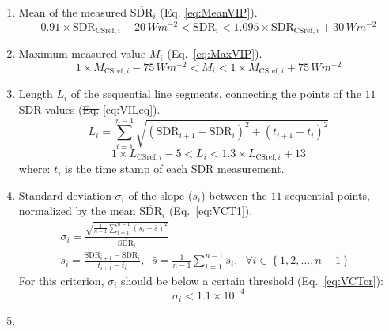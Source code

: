 \documentclass[applsci,article,submit,moreauthors,pdftex]{Definitions/mdpi}
\providecommand{\tightlist}{%
  \setlength{\itemsep}{0pt}\setlength{\parskip}{0pt}}
\providecommand{\DIFadd}[1]{{\protect\color{blue}\uwave{#1}}} %
\providecommand{\DIFdel}[1]{{\protect\color{red}\sout{#1}}}                      %
\providecommand{\DIFaddbegin}{} %
\providecommand{\DIFaddend}{} %
\providecommand{\DIFdelbegin}{} %
\providecommand{\DIFdelend}{} %
\begin{document}
\begin{enumerate}
\def\labelenumi{\alph{enumi})}
\tightlist
\item
  Mean of the measured \(\overline{\text{SDR}}_i\) (Eq.
  \ref{eq:MeanVIP}). \begin{equation}
  0.91 \times \overline{\text{SDR}}_{\text{CSref},i} - 20\,Wm^{-2}
  < \overline{\text{SDR}}_i <
  1.095 \times \overline{\text{SDR}}_{\text{CSref},i} + 30\,Wm^{-2}
  \label{eq:MeanVIP}
  \end{equation}
\item
  Maximum measured value \(M_{i}\) (Eq.~\ref{eq:MaxVIP}).
  \begin{equation}
  1 \times M_{\text{CSref},i} - 75\,Wm^{-2}
  < M_{i} <
  1 \times M_{\text{CSref},i} + 75\,Wm^{-2}
  \label{eq:MaxVIP}
  \end{equation}
\item
  Length \(L_i\) of the sequential line segments, connecting the points
  of the \(11\) SDR values (\DIFdelbegin \DIFdel{Eq. }\DIFdelend \DIFaddbegin \DIFadd{Equation }\DIFaddend \ref{eq:VILeq}). \begin{equation}
  L_i = \sum_{i=1}^{n-1}\sqrt{\left ( \text{SDR}_{i+1} - \text{SDR}_{i}\right )^2 + \left ( t_{i+1} - t_i \right )^2}
  \label{eq:VILeq}
  \end{equation} \begin{equation}
  1 \times L_{\text{CSref},i} - 5 < L_i < 1.3 \times L_{\text{CSref},i} + 13
  \label{eq:VILcr}
  \end{equation} where: \(t_i\) is the time stamp of each SDR
  measurement.
\item
  Standard deviation \(\sigma_i\) of the slope (\(s_i\)) between the
  \(11\) sequential points, normalized by the mean
  \(\overline{\text{SDR}}_i\) (Eq.~\ref{eq:VCT1}). \begin{gather}
    \sigma_i = \frac{\sqrt{\frac{1}{n-1} \sum_{i=1}^{n-1} \left( s_i - \bar{s} \right)^2}}{\overline{\text{SDR}}_i} \label{eq:VCT1} \\
    s_i = \frac{\text{SDR}_{i+1} - \text{SDR}_{i}}{t_{i+1} - t_i},\;\;   \bar{s} = \frac{1}{n-1} \sum_{i=1}^{n-1} s_i,\;\;\forall i \in \left \{ 1, 2, \ldots, n-1 \right \}\;\;
  \end{gather} For this criterion, \(\sigma_i\) should be below a
  certain threshold (Eq.~\ref{eq:VCTcr}): \begin{equation}
    \sigma_i < \ensuremath{1.1\times 10^{-4}} \label{eq:VCTcr}
  \end{equation}
\item

\end{enumerate}
\end{document}
